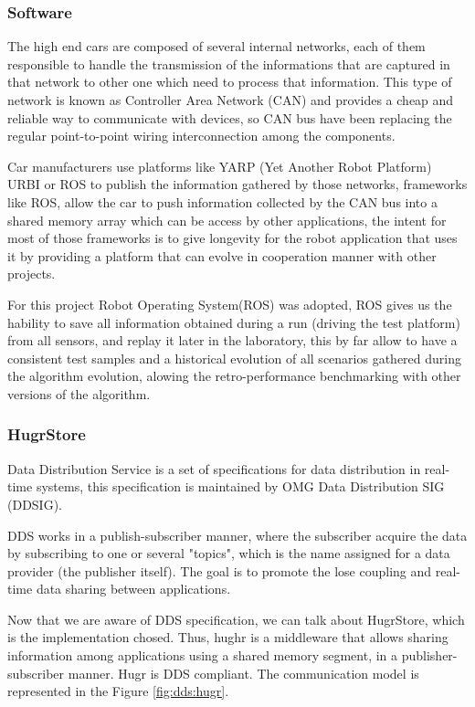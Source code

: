 \subsubsection*{Software}

The high end cars are composed of several internal networks, each of them responsible to handle the transmission of the informations that are captured in that network to other one which need to process that information. This type of network is known as Controller Area Network (CAN) and provides a cheap and reliable way to communicate with devices, so CAN bus have been replacing the regular point-to-point wiring interconnection among the components\cite{bosch91can}.

Car manufacturers use platforms like YARP (Yet Another Robot Platform) URBI or ROS to publish the information gathered by those networks, frameworks like ROS, allow the car to push information collected by the CAN bus into a shared memory array which can be access by other applications, the intent for most of those frameworks is to give longevity\cite{Fitzpatrick:2008:TLR:1327539.1327705} for the robot application that uses it by providing a platform that can evolve in cooperation manner with other projects.

For this project Robot Operating System(ROS) was adopted, ROS gives us the hability to save all information obtained during a run (driving the test platform) from all sensors, and replay it later in the laboratory, this by far allow to have a consistent test samples and a historical evolution of all scenarios gathered during the algorithm evolution, alowing the retro-performance benchmarking with other versions of the algorithm.

\subsubsection*{HugrStore}

Data Distribution Service\cite{dds} is a set of specifications for data distribution in real-time systems, this specification is maintained by OMG Data Distribution SIG (DDSIG).

DDS works in a publish-subscriber manner, where the subscriber acquire the data by subscribing to one or several  "topics", which is the name assigned for a data provider (the publisher itself). The goal is to promote the lose coupling and real-time data sharing between applications.

Now that we are aware of DDS specification, we can talk about HugrStore, which is the implementation chosed. Thus, hughr is a middleware that allows sharing information among applications using a shared memory segment, in a publisher-subscriber manner. Hugr is DDS compliant. The communication model is represented in the Figure \ref{fig:dds:hugr}.

